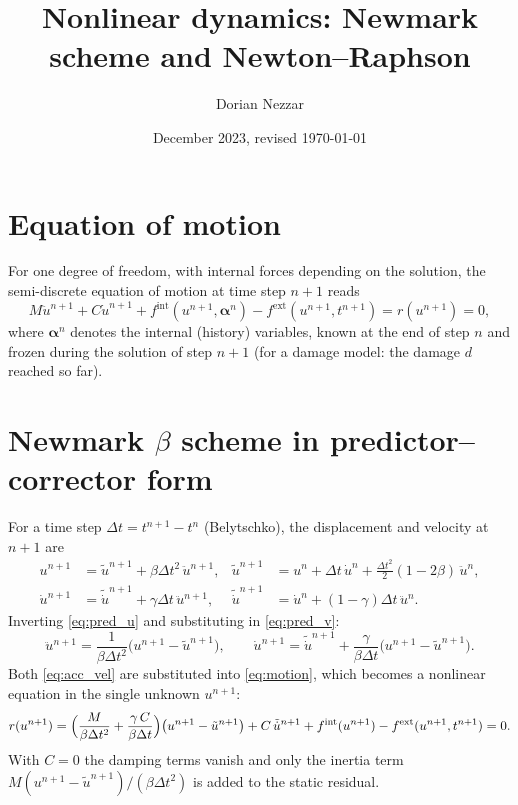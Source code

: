 \documentclass[11pt,a4paper]{article}
\title{Nonlinear dynamics: Newmark scheme and Newton--Raphson}
\author{Dorian Nezzar}
\date{December 2023, revised \today}
\begin{document}
\maketitle

\section{Equation of motion}
For one degree of freedom, with internal forces depending on the solution, the semi-discrete
equation of motion at time step $n+1$ reads
\begin{equation}
  M\ddot u^{n+1} + C\dot u^{n+1} + f^{\text{int}}(u^{n+1}, \boldsymbol\alpha^{n}) - f^{\text{ext}}(u^{n+1},t^{n+1})
  = r(u^{n+1}) = 0 ,
  \label{eq:motion}
\end{equation}
where $\boldsymbol\alpha^n$ denotes the internal (history) variables, known at the end of step $n$
and frozen during the solution of step $n+1$ (for a damage model: the damage $d$ reached so far).

\section{Newmark $\beta$ scheme in predictor--corrector form}
For a time step $\Delta t = t^{n+1}-t^n$ (Belytschko), the displacement and velocity at $n+1$ are
\begin{align}
  u^{n+1} &= \tilde u^{n+1} + \beta\Delta t^2\,\ddot u^{n+1}, &
  \tilde u^{n+1} &= u^n + \Delta t\,\dot u^n + \frac{\Delta t^2}{2}(1-2\beta)\,\ddot u^n, \label{eq:pred_u}\\
  \dot u^{n+1} &= \tilde{\dot u}^{n+1} + \gamma\Delta t\,\ddot u^{n+1}, &
  \tilde{\dot u}^{n+1} &= \dot u^n + (1-\gamma)\Delta t\,\ddot u^n . \label{eq:pred_v}
\end{align}
Inverting \eqref{eq:pred_u} and substituting in \eqref{eq:pred_v}:
\begin{equation}
  \ddot u^{n+1} = \frac{1}{\beta\Delta t^2}\bigl(u^{n+1}-\tilde u^{n+1}\bigr),\qquad
  \dot u^{n+1} = \tilde{\dot u}^{n+1} + \frac{\gamma}{\beta\Delta t}\bigl(u^{n+1}-\tilde u^{n+1}\bigr).
  \label{eq:acc_vel}
\end{equation}
Both \eqref{eq:acc_vel} are substituted into \eqref{eq:motion}, which becomes a nonlinear
equation in the single unknown $u^{n+1}$:
\begin{equation}
  r(u^{n+1}) = \Bigl(\frac{M}{\beta\Delta t^2} + \frac{\gamma\,C}{\beta\Delta t}\Bigr)\bigl(u^{n+1}-\tilde u^{n+1}\bigr)
  + C\,\tilde{\dot u}^{n+1} + f^{\text{int}}(u^{n+1}) - f^{\text{ext}}(u^{n+1},t^{n+1}) = 0 .
  \label{eq:residual}
\end{equation}
With $C = 0$ the damping terms vanish and only the inertia term $M(u^{n+1}-\tilde u^{n+1})/(\beta\Delta t^2)$
is added to the static residual.
\end{document}
